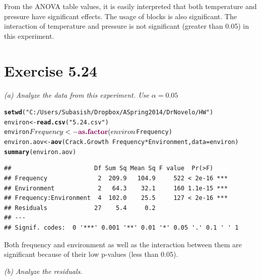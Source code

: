 \documentclass[a4paper]{article}\usepackage{graphicx, color}
\makeatletter
\newcommand{\hlfunctioncall}[1]{\textcolor[rgb]{0.501960784313725,0,0.329411764705882}{\textbf{#1}}}%
\newcommand{\hlstring}[1]{\textcolor[rgb]{0.6,0.6,1}{#1}}%
\newenvironment{kframe}{%
 \def\at@end@of@kframe{}%
 \ifinner\ifhmode%
  \def\at@end@of@kframe{\end{minipage}}%
  \begin{minipage}{\columnwidth}%
 \fi\fi%
 \def\FrameCommand##1{\hskip\@totalleftmargin \hskip-\fboxsep
 \colorbox{shadecolor}{##1}\hskip-\fboxsep
     \hskip-\linewidth \hskip-\@totalleftmargin \hskip\columnwidth}%
 \MakeFramed {\advance\hsize-\width
   \@totalleftmargin\z@ \linewidth\hsize
   \@setminipage}}%
 {\par\unskip\endMakeFramed%
 \at@end@of@kframe}
\newenvironment{knitrout}{}{} %
\makeatother
\begin{document}
From the ANOVA table values, it is easily interpreted that both temperature and pressure have significant effects. The usage of blocks is also significant. The interaction of temperature and pressure is not significant (greater than 0.05) in this experiment.\\
\vspace{2 mm}

\section{ Exercise 5.24}

\textit{(a) Analyze the data from this experiment. Use  $\alpha = 0.05$ }\\
\begin{knitrout}
\color{fgcolor}\begin{kframe}
\begin{alltt}
\hlfunctioncall{setwd}(\hlstring{"C:/Users/Subasish/Dropbox/A Spring 2014/Dr Novelo/HW"})
environ <- \hlfunctioncall{read.csv}(\hlstring{"5.24.csv"})
environ$Frequency <- \hlfunctioncall{as.factor}(environ$Frequency)
environ.aov <- \hlfunctioncall{aov}(Crack.Growth ~ Frequency * Environment, data = environ)
\hlfunctioncall{summary}(environ.aov)
\end{alltt}
\begin{verbatim}
##                       Df Sum Sq Mean Sq F value  Pr(>F)    
## Frequency              2  209.9   104.9     522 < 2e-16 ***
## Environment            2   64.3    32.1     160 1.1e-15 ***
## Frequency:Environment  4  102.0    25.5     127 < 2e-16 ***
## Residuals             27    5.4     0.2                    
## ---
## Signif. codes:  0 '***' 0.001 '**' 0.01 '*' 0.05 '.' 0.1 ' ' 1
\end{verbatim}
\end{kframe}
\end{knitrout}


Both frequency and environment as well as the interaction between them are significant because of their low p-values (less than 0.05).\\

\vspace{2 mm}

\textit{(b) Analyze the residuals.}\\
\end{document}
